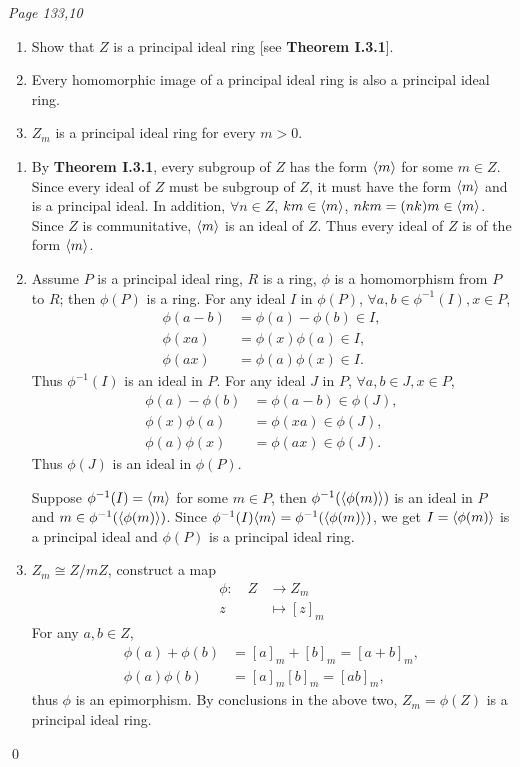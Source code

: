 \begin{enumerate}
\prob
\textit{Page 133,10}
\begin{enumerate}
	\item Show that $Z$ is a principal ideal ring [see \textbf{Theorem I.3.1}].
	\item Every homomorphic image of a principal ideal ring is also a principal ideal ring.
	\item $Z_m$ is a principal ideal ring for every $m > 0$.
\end{enumerate}
\soln
\begin{enumerate}
	\item By \textbf{Theorem I.3.1}, every subgroup of $Z$ has the form $\langle m\rangle$ for some $m\in Z$. Since every ideal of $Z$ must be subgroup of $Z$, it must have the form $\langle m\rangle$ and is a principal ideal.
	In addition, $\forall n\in Z$, $km \in \langle m\rangle$, $nkm=(nk)m \in \langle m\rangle$. Since $Z$ is communitative, $\langle m\rangle$ is an ideal of $Z$. Thus every ideal of $Z$ is of the form $\langle m\rangle$.
	\item Assume $P$ is a principal ideal ring, $R$ is a ring, $\phi$ is a homomorphism from $P$ to $R$; then $\phi(P)$ is a ring. For any ideal $I$ in $\phi(P)$, $\forall a,b \in \phi^{-1}(I), x \in P$, \begin{align*}
		\phi(a-b) & = \phi(a)-\phi(b) \in I, \\
		\phi(xa) & = \phi(x)\phi(a) \in I, \\
		\phi(ax) & = \phi(a)\phi(x) \in I. 
	\end{align*}
	Thus $\phi^{-1}(I)$ is an ideal in $P$. For any ideal $J$ in $P$, $\forall a,b \in J, x \in P$,
	\begin{align*}
		\phi(a)-\phi(b) & =\phi(a-b) \in \phi(J), \\
		\phi(x)\phi(a) & =\phi(xa) \in \phi(J), \\
		\phi(a)\phi(x) & =\phi(ax) \in \phi(J). 
	\end{align*}
	Thus $\phi(J)$ is an ideal in $\phi(P)$.

	Suppose $\phi^{-1}(I)=\langle m\rangle$ for some $m\in P$, then $\phi^{-1}(\langle\phi(m)\rangle)$ is an ideal in $P$ and $m\in \phi^{-1}(\langle\phi(m)\rangle)$. Since $\phi^{-1}(I)\langle m\rangle=\phi^{-1}(\langle\phi(m)\rangle)$, we get $I=\langle\phi(m)\rangle$ is a principal ideal and $\phi(P)$ is a principal ideal ring.
	\item $Z_m\cong Z/mZ$, construct a map \begin{align*}
		\phi:\quad Z &\to Z_m \\
		z &\mapsto [z]_m
	\end{align*}
	For any $a,b\in Z$, \begin{align*}
		\phi(a)+\phi(b) &= [a]_m+[b]_m=[a+b]_m, \\
		\phi(a)\phi(b) &= [a]_m[b]_m=[ab]_m,
	\end{align*}
	thus $\phi$ is an epimorphism. By conclusions in the above two, $Z_m=\phi(Z)$ is a principal ideal ring.
\end{enumerate}
\qed


\end{enumerate}
